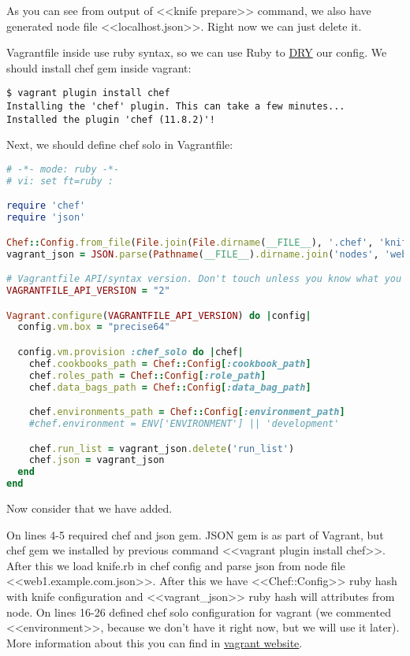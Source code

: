 As you can see from output of <<knife prepare>> command, we also have generated node file <<localhost.json>>. Right now we can just delete it.

Vagrantfile inside use ruby syntax, so we can use Ruby to \href{http://en.wikipedia.org/wiki/Dont\_repeat\_yourself}{DRY} our config. We should install chef gem inside vagrant:

\begin{lstlisting}[label=lst:my-cloud-vagrant6,title=my-cloud/nodes/Vagrantfile]
$ vagrant plugin install chef
Installing the 'chef' plugin. This can take a few minutes...
Installed the plugin 'chef (11.8.2)'!
\end{lstlisting}

Next, we should define chef solo in Vagrantfile:

\begin{lstlisting}[language=Ruby,label=lst:my-cloud-vagrant7,title=my-cloud/nodes/Vagrantfile]
# -*- mode: ruby -*-
# vi: set ft=ruby :

require 'chef'
require 'json'

Chef::Config.from_file(File.join(File.dirname(__FILE__), '.chef', 'knife.rb'))
vagrant_json = JSON.parse(Pathname(__FILE__).dirname.join('nodes', 'web1.example.com.json').read)

# Vagrantfile API/syntax version. Don't touch unless you know what you're doing!
VAGRANTFILE_API_VERSION = "2"

Vagrant.configure(VAGRANTFILE_API_VERSION) do |config|
  config.vm.box = "precise64"

  config.vm.provision :chef_solo do |chef|
    chef.cookbooks_path = Chef::Config[:cookbook_path]
    chef.roles_path = Chef::Config[:role_path]
    chef.data_bags_path = Chef::Config[:data_bag_path]

    chef.environments_path = Chef::Config[:environment_path]
    #chef.environment = ENV['ENVIRONMENT'] || 'development'

    chef.run_list = vagrant_json.delete('run_list')
    chef.json = vagrant_json
  end
end
\end{lstlisting}

Now consider that we have added.

On lines 4-5 required chef and json gem. JSON gem is as part of Vagrant, but chef gem we installed by previous command <<vagrant plugin install chef>>. After this we load knife.rb in chef config and parse json from node file <<web1.example.com.json>>. After this we have <<Chef::Config>> ruby hash with knife configuration and <<vagrant\_json>> ruby hash will attributes from node. On lines 16-26 defined chef solo configuration for vagrant (we commented <<environment>>, because we don't have it right now, but we will use it later). More information about this you can find in \href{http://docs.vagrantup.com/v2/provisioning/chef\_solo.html}{vagrant website}.

